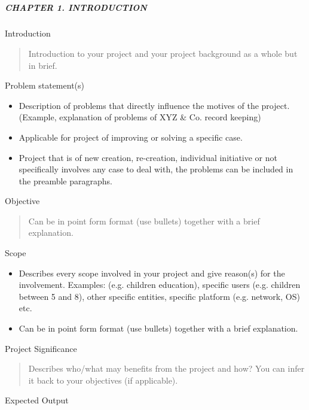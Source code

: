 \documentclass[12pt,a4paper]{article}
\begin{document}
\subsection{}\label{section}

\subparagraph{CHAPTER 1. INTRODUCTION}\label{chapter-1.-introduction}

Introduction

\begin{quote}
Introduction to your project and your project background as a whole but
in brief.
\end{quote}

Problem statement(s)

\begin{itemize}
\item
  Description of problems that directly influence the motives of the
  project. (Example, explanation of problems of XYZ \& Co. record
  keeping)
\item
  Applicable for project of improving or solving a specific case.
\item
  Project that is of new creation, re-creation, individual initiative or
  not specifically involves any case to deal with, the problems can be
  included in the preamble paragraphs.
\end{itemize}

Objective

\begin{quote}
Can be in point form format (use bullets) together with a brief
explanation.
\end{quote}

Scope

\begin{itemize}
\item
  Describes every scope involved in your project and give reason(s) for
  the involvement. Examples: (e.g. children education), specific users
  (e.g. children between 5 and 8), other specific entities, specific
  platform (e.g. network, OS) etc.
\item
  Can be in point form format (use bullets) together with a brief
  explanation.
\end{itemize}

Project Significance

\begin{quote}
Describes who/what may benefits from the project and how? You can infer
it back to your objectives (if applicable).
\end{quote}

Expected Output
\end{document}
